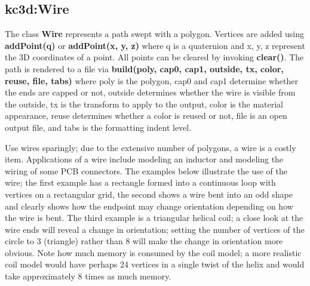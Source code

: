 \subsection{kc3d:Wire}
The class \textbf{Wire} represents a path swept with a polygon.
Vertices are added using \textbf{addPoint(q)} or \textbf{addPoint(x, y, z)}
where q is a quaternion and x, y, z represent the 3D coordinates of a point.
All points can be cleared by invoking \textbf{clear()}. The path is
rendered to a file via \textbf{build(poly, cap0, cap1, outside, tx, color, reuse, file, tabs)}
where poly is the polygon, cap0 and cap1 determine whether the ends are capped or not,
outside determines whether the wire is visible from the outside, tx is the transform
to apply to the output, color is the material appearance, reuse determines whether a
color is reused or not, file is an open output file, and tabs is the formatting
indent level.

Use wires sparingly; due to the extensive number of polygons, a wire is a costly
item. Applications of a wire include modeling an inductor and modeling the
wiring of some PCB connectors. The examples below illustrate the use of the
wire; the first example has a rectangle formed into a continuous loop with
vertices on a rectangular grid, the second shows a wire bent into an odd shape
and clearly shows how the endpoint may change orientation depending on how the
wire is bent.  The third example is a triangular helical coil; a close look at
the wire ends will reveal a change in orientation; setting the number of
vertices of the circle to 3 (triangle) rather than 8 will make the change in
orientation more obvious. Note how much memory is consumed by the coil model;
a more realistic coil model would have perhaps 24 vertices in a single twist
of the helix and would take approximately 8 times as much memory.


